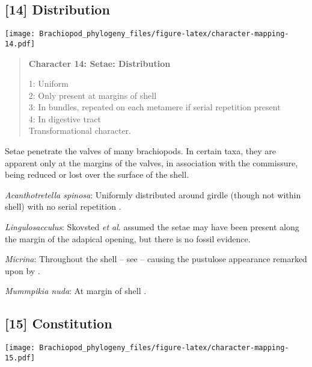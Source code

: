 \documentclass[openany]{book}
\theoremstyle{definition}
\theoremstyle{definition}
\theoremstyle{definition}
\theoremstyle{remark}
\begin{document}
\subsection*{{[}14{]} Distribution}\label{distribution}

\texttt{[image: Brachiopod\_phylogeny\_files/figure-latex/character-mapping-14.pdf]}

\begin{quote}
\textbf{Character 14: Setae: Distribution}

1: Uniform\\
2: Only present at margins of shell\\
3: In bundles, repeated on each metamere if serial repetition present\\
4: In digestive tract\\
Transformational character.
\end{quote}

Setae penetrate the valves of many brachiopods. In certain taxa, they
are apparent only at the margins of the valves, in association with the
commissure, being reduced or lost over the surface of the shell.

\hypertarget{Acanthotretella_spinosa-coding-14}{}
\emph{Acanthotretella spinosa}: Uniformly distributed around girdle
(though not within shell) with no serial repetition
\citep{Vinther2005, Leise1988}.

\hypertarget{Lingulosacculus-coding-14}{}
\emph{Lingulosacculus}: Skovsted \emph{et al}.
\citeyearpar{Skovsted2011Scleritomeconstruction} assumed the setae may
have been present along the margin of the adapical opening, but there is
no fossil evidence.

\hypertarget{Micrina-coding-14}{}
\emph{Micrina}: Throughout the shell -- see
\citet{Williams2007Supplement} -- causing the pustulose appearance
remarked upon by \citet{Chen2007Reinterpretationof}.

\hypertarget{Mummpikia_nuda-coding-14}{}
\emph{Mummpikia nuda}: At margin of shell \citep{Zhang2005}.

\subsection*{{[}15{]} Constitution}\label{constitution}

\texttt{[image: Brachiopod\_phylogeny\_files/figure-latex/character-mapping-15.pdf]}
\end{document}
